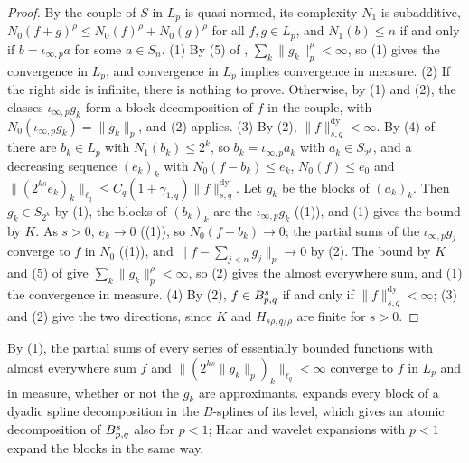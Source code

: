 \begin{proof}
\leanok
{}
By  the couple of $S$ in $L_p$ is quasi-normed, its complexity $N_1$
is subadditive, $N_0(f + g)^\rho \leq N_0(f)^\rho + N_0(g)^\rho$ for all $f, g \in L_p$, and
$N_1(b) \leq n$ if and only if $b = \iota_{\infty,p} a$ for some $a \in S_n$. (1) By (5) of
, $\sum_k \|g_k\|_p^\rho < \infty$, so (1)
gives the convergence in $L_p$, and convergence in $L_p$ implies convergence in measure. (2) If
the right side is infinite, there is nothing to prove. Otherwise, by (1) and
(2), the classes $\iota_{\infty,p} g_k$ form a block
decomposition of $f$ in the couple, with $N_0(\iota_{\infty,p} g_k) = \|g_k\|_p$, and
(2) applies. (3) By (2),
$\|f\|^{\mathrm{dy}}_{s,q} < \infty$. By (4) of  there are $b_k \in L_p$
with $N_1(b_k) \leq 2^k$, so $b_k = \iota_{\infty,p} a_k$ with $a_k \in S_{2^k}$, and a
decreasing sequence $(e_k)_k$ with $N_0(f - b_k) \leq e_k$, $N_0(f) \leq e_0$ and
$\|(2^{ks} e_k)_k\|_{\ell_q} \leq C_q (1 + \gamma_{1,q}) \|f\|^{\mathrm{dy}}_{s,q}$. Let $g_k$ be
the blocks of $(a_k)_k$. Then $g_k \in S_{2^k}$ by (1), the
blocks of $(b_k)_k$ are the $\iota_{\infty,p} g_k$ ((1)), and
(1) gives the bound by $K$. As $s > 0$, $e_k \to 0$
((1)), so $N_0(f - b_k) \to 0$; the partial sums of the
$\iota_{\infty,p} g_j$ converge to $f$ in $N_0$ ((1)), and
$\bigl\|f - \sum_{j<n} g_j\bigr\|_p \to 0$ by (2). The bound
by $K$ and (5) of  give $\sum_k \|g_k\|_p^\rho < \infty$, so
(2) gives the almost everywhere sum, and (1) the convergence in
measure. (4) By (2), $f \in B^{s}_{p,q}$ if and only if
$\|f\|^{\mathrm{dy}}_{s,q} < \infty$; (3) and (2) give the two directions, since $K$ and
$H_{s\rho, q/\rho}$ are finite for $s > 0$.
\end{proof}

By (1), the partial sums of every series of essentially bounded functions with almost
everywhere sum $f$ and $\|(2^{ks} \|g_k\|_p)_k\|_{\ell_q} < \infty$ converge to $f$ in $L_p$ and
in measure, whether or not the $g_k$ are approximants. \cite[Corollary~5.3]{DeVorePopovTAMS}
expands every block of a dyadic spline decomposition in the $B$-splines of its level, which
gives an atomic decomposition of $B^{s}_{p,q}$ also for $p < 1$; Haar and wavelet
expansions with $p < 1$ expand the blocks in the same way.

